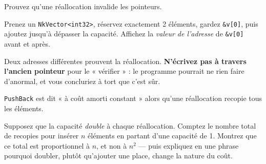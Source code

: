 \begin{nkdemo}
Prouvez qu'une réallocation invalide les pointeurs.

Prenez un \texttt{NkVector<int32>}, réservez exactement 2 éléments, gardez
\texttt{\&v[0]}, puis ajoutez jusqu'à dépasser la capacité. Affichez la
\emph{valeur de l'adresse} de \texttt{\&v[0]} avant et après.

Deux adresses différentes prouvent la réallocation. \textbf{N'écrivez pas à
travers l'ancien pointeur} pour le « vérifier » : le programme pourrait ne rien
faire d'anormal, et vous concluriez à tort que c'est sûr.
\end{nkdemo}

\begin{nklogique}
\texttt{PushBack} est dit « à coût amorti constant » alors qu'une réallocation
recopie tous les éléments.

Supposez que la capacité \emph{double} à chaque réallocation. Comptez le nombre
total de recopies pour insérer $n$ éléments en partant d'une capacité de 1.
Montrez que ce total est proportionnel à $n$, et non à $n^2$ --- puis expliquez
en une phrase pourquoi doubler, plutôt qu'ajouter une place, change la nature du
coût.
\end{nklogique}
